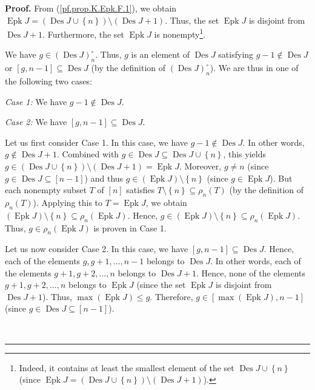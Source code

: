 \documentclass[numbers=enddot,12pt,final,onecolumn,notitlepage]{scrartcl}%
\theoremstyle{definition}
\newenvironment{proof}[1][Proof]{\noindent\textbf{#1.} }{\ \rule{0.5em}{0.5em}}
\newenvironment{verlong}{}{}
\begin{document}
\begin{verlong}
\begin{proof}
From (\ref{pf.prop.K.Epk.F.1}), we obtain $\operatorname{Epk}J=\left(
\operatorname{Des}J\cup\left\{  n\right\}  \right)  \setminus\left(
\operatorname{Des}J+1\right)  $. Thus, the set $\operatorname{Epk}J$ is
disjoint from $\operatorname{Des}J+1$. Furthermore, the set
$\operatorname{Epk}J$ is nonempty\footnote{Indeed, it contains at least the
smallest element of the set $\operatorname{Des}J\cup\left\{  n\right\}  $
(since $\operatorname{Epk}J=\left(  \operatorname{Des}J\cup\left\{
n\right\}  \right)  \setminus\left(  \operatorname{Des}J+1\right)  $).}.

We have $g\in\left(  \operatorname{Des}J\right)  _{n}^{\circ}$. Thus, $g$ is
an element of $\operatorname{Des}J$ satisfying $g-1\notin\operatorname{Des}
J$ or $\left[  g,n-1\right]  \subseteq\operatorname{Des}J$ (by the definition
of $\left(  \operatorname{Des}J\right)  _{n}^{\circ}$). We are thus in one of
the following two cases:

\textit{Case 1:} We have $g-1\notin\operatorname{Des}J$.

\textit{Case 2:} We have $\left[  g,n-1\right]  \subseteq\operatorname{Des}J$.

Let us first consider Case 1. In this case, we have $g-1\notin%
\operatorname{Des}J$. In other words, $g\notin\operatorname{Des}J+1$.
Combined with $g\in\operatorname{Des}J\subseteq\operatorname{Des}
J\cup\left\{  n\right\}  $, this yields $g\in\left(  \operatorname{Des}
J\cup\left\{  n\right\}  \right)  \setminus\left(  \operatorname{Des}
J+1\right)  =\operatorname{Epk}J$. Moreover, $g\neq n$ (since $g\in
\operatorname{Des}J\subseteq\left[  n-1\right]  $) and thus $g\in\left(
\operatorname{Epk}J\right)  \setminus\left\{  n\right\}  $ (since
$g\in\operatorname{Epk}J$). But each nonempty subset $T$ of $\left[
n\right]  $ satisfies $T\setminus\left\{  n\right\}  \subseteq\rho_{n}\left(
T\right)  $ (by the definition of $\rho_{n}\left(  T\right)  $). Applying this
to $T=\operatorname{Epk}J$, we obtain $\left(  \operatorname{Epk}J\right)
\setminus\left\{  n\right\}  \subseteq\rho_{n}\left(  \operatorname{Epk}
J\right)  $. Hence, $g\in\left(  \operatorname{Epk}J\right)  \setminus
\left\{  n\right\}  \subseteq\rho_{n}\left(  \operatorname{Epk}J\right)  $.
Thus, $g\in\rho_{n}\left(  \operatorname{Epk}J\right)  $ is proven in Case 1.

Let us now consider Case 2. In this case, we have $\left[  g,n-1\right]
\subseteq\operatorname{Des}J$. Hence, each of the elements $g,g+1,\ldots,n-1$
belongs to $\operatorname{Des}J$. In other words, each of the elements
$g+1,g+2,\ldots,n$ belongs to $\operatorname{Des}J+1$. Hence, none of the
elements $g+1,g+2,\ldots,n$ belongs to $\operatorname{Epk}J$ (since the set
$\operatorname{Epk}J$ is disjoint from $\operatorname{Des}J+1$). Thus,
$\max\left(  \operatorname{Epk}J\right)  \leq g$. Therefore, $g\in\left[
\max\left(  \operatorname{Epk}J\right)  ,n-1\right]  $ (since $g\in
\operatorname{Des}J\subseteq\left[  n-1\right]  $).


\end{proof}
\end{verlong}
\end{document}
